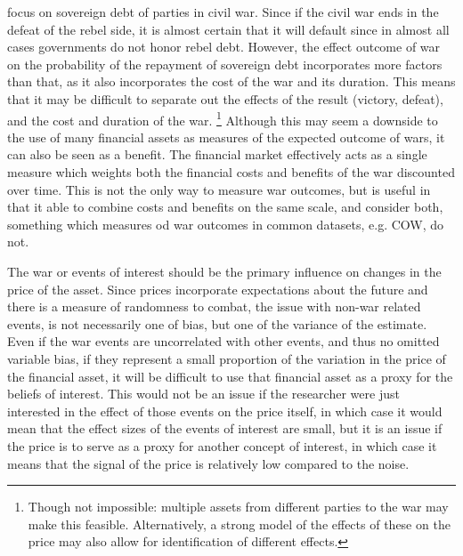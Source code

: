 \textcite{HaberMitchenerOosterlinckEtAl2015} focus on sovereign debt of parties in civil war.
Since if the civil war ends in the defeat of the rebel side, it is almost certain that it will default since in almost all cases governments do not honor rebel debt.
However, the effect outcome of war on the probability of the repayment of sovereign debt incorporates more factors than that, as it also incorporates the cost of the war and its duration.
This means that it may be difficult to separate out the effects of the result (victory, defeat), and the cost and duration of the war.%
\footnote{
  Though not impossible: multiple assets from different parties to the war may make this feasible.
  Alternatively, a strong model of the effects of these on the price may also allow for identification of different effects.
}
Although this may seem a downside to the use of many financial assets as measures of the expected outcome of wars, it can also be seen as a benefit.
The financial market effectively acts as a single measure which weights both the financial costs and benefits of the war discounted over time.
This is not the only way to measure war outcomes, but is useful in that it able to combine costs and benefits on the same scale, and consider both, something which measures od war outcomes in common datasets, e.g. COW, do not.

The war or events of interest should be the primary influence on changes in the price of the asset.
Since prices incorporate expectations about the future and there is a measure of randomness to combat, the issue with non-war related events, is not necessarily one of bias, but one of the variance of the estimate.
Even if the war events are uncorrelated with other events, and thus no omitted variable bias, if they represent a small proportion of the variation in the price of the financial asset, it will be difficult to use that financial asset as a proxy for the beliefs of interest.
This would not be an issue if the researcher were just interested in the effect of those events on the price itself, in which case it would mean that the effect sizes of the events of interest are small, but it is an issue if the price is to serve as a proxy for another concept of interest, in which case it means that the signal of the price is relatively low compared to the noise.


